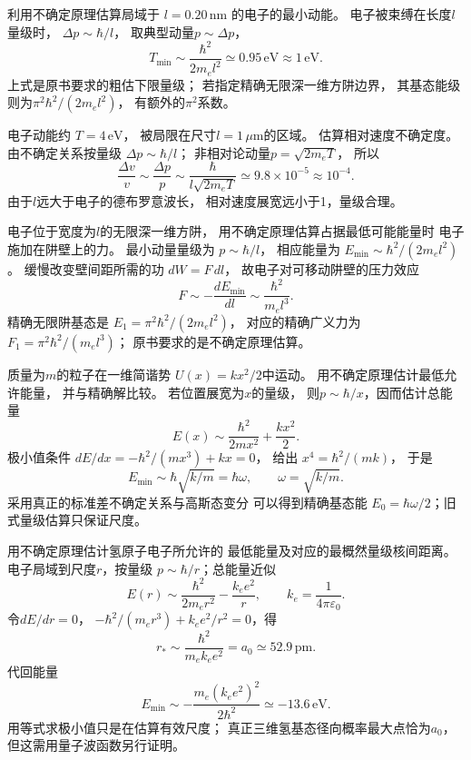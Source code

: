 利用不确定原理估算局域于
$l=0.20\,\mathrm{nm}$ 的电子的最小动能。
\exsolution
电子被束缚在长度$l$量级时，
$\Delta p\sim\hbar/l$，
取典型动量$p\sim\Delta p$，
\[
 \boxed{T_{\min}\sim\frac{\hbar^2}{2m_e l^2}
 \simeq0.95\,\mathrm{eV}\approx1\,\mathrm{eV}}.
\]
\excheck 上式是原书要求的粗估下限量级；
若指定精确无限深一维方阱边界，
其基态能级则为$\pi^2\hbar^2/(2m_el^2)$，
有额外的$\pi^2$系数。

电子动能约 $T=4\,\mathrm{eV}$，
被局限在尺寸$l=1\,\mu\mathrm m$的区域。
估算相对速度不确定度。
\exsolution
由不确定关系按量级
$\Delta p\sim\hbar/l$；
非相对论动量$p=\sqrt{2m_eT}$，
所以
\[
 \boxed{\frac{\Delta v}{v}\sim\frac{\Delta p}{p}
 \sim\frac{\hbar}{l\sqrt{2m_eT}}
 \simeq9.8\times10^{-5}\approx10^{-4}}.
\]
\excheck 由于$l$远大于电子的德布罗意波长，
相对速度展宽远小于1，量级合理。

电子位于宽度为$l$的无限深一维方阱，
用不确定原理估算占据最低可能能量时
电子施加在阱壁上的力。
\exsolution
最小动量量级为
$p\sim\hbar/l$，
相应能量为
$E_{\min}\sim\hbar^2/(2m_el^2)$。
缓慢改变壁间距所需的功
$dW=F\,dl$，
故电子对可移动阱壁的压力效应
\[
 \boxed{F\sim-\frac{dE_{\min}}{dl}
 \sim\frac{\hbar^2}{m_el^3}}.
\]
\excheck 精确无限阱基态是
$E_1=\pi^2\hbar^2/(2m_el^2)$，
对应的精确广义力为
$F_1=\pi^2\hbar^2/(m_el^3)$；
原书要求的是不确定原理估算。

质量为$m$的粒子在一维简谐势
$U(x)=kx^2/2$中运动。
用不确定原理估计最低允许能量，
并与精确解比较。
\exsolution
若位置展宽为$x$的量级，
则$p\sim\hbar/x$，因而估计总能量
\[
 E(x)\sim\frac{\hbar^2}{2mx^2}+\frac{kx^2}{2}.
\]
极小值条件
$dE/dx=-\hbar^2/(mx^3)+kx=0$，
给出
$x^4=\hbar^2/(mk)$，
于是
\[
 \boxed{E_{\min}\sim\hbar\sqrt{k/m}
 =\hbar\omega},\qquad \omega=\sqrt{k/m}.
\]
\excheck 采用真正的标准差不确定关系与高斯态变分
可以得到精确基态能
$E_0=\hbar\omega/2$；旧式量级估算只保证尺度。

用不确定原理估计氢原子电子所允许的
最低能量及对应的最概然量级核间距离。
\exsolution
电子局域到尺度$r$，按量级
$p\sim\hbar/r$；总能量近似
\[
 E(r)\sim\frac{\hbar^2}{2m_er^2}
 -\frac{k_ee^2}{r},
 \qquad k_e=\frac1{4\pi\varepsilon_0}.
\]
令$dE/dr=0$，
$-\hbar^2/(m_er^3)+k_ee^2/r^2=0$，得
\[
 \boxed{r_*\sim\frac{\hbar^2}{m_ek_ee^2}
 =a_0\simeq52.9\,\mathrm{pm}}.
\]
代回能量
\[
 \boxed{E_{\min}\sim-\frac{m_e(k_ee^2)^2}{2\hbar^2}
 \simeq-13.6\,\mathrm{eV}}.
\]
\excheck 用等式求极小值只是在估算有效尺度；
真正三维氢基态径向概率最大点恰为$a_0$，
但这需用量子波函数另行证明。

